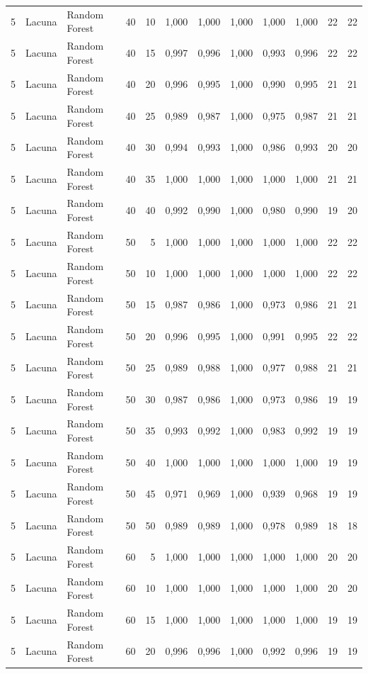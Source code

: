 \begin{longtable}{@{}rllrrrrrrrrr@{}}
5 & Lacuna & Random Forest & 40 & 10 & 1,000 & 1,000 & 1,000 & 1,000 & 1,000 & 22 & 22 \\
5 & Lacuna & Random Forest & 40 & 15 & 0,997 & 0,996 & 1,000 & 0,993 & 0,996 & 22 & 22 \\
5 & Lacuna & Random Forest & 40 & 20 & 0,996 & 0,995 & 1,000 & 0,990 & 0,995 & 21 & 21 \\
5 & Lacuna & Random Forest & 40 & 25 & 0,989 & 0,987 & 1,000 & 0,975 & 0,987 & 21 & 21 \\
5 & Lacuna & Random Forest & 40 & 30 & 0,994 & 0,993 & 1,000 & 0,986 & 0,993 & 20 & 20 \\
5 & Lacuna & Random Forest & 40 & 35 & 1,000 & 1,000 & 1,000 & 1,000 & 1,000 & 21 & 21 \\
5 & Lacuna & Random Forest & 40 & 40 & 0,992 & 0,990 & 1,000 & 0,980 & 0,990 & 19 & 20 \\
5 & Lacuna & Random Forest & 50 & 5 & 1,000 & 1,000 & 1,000 & 1,000 & 1,000 & 22 & 22 \\
5 & Lacuna & Random Forest & 50 & 10 & 1,000 & 1,000 & 1,000 & 1,000 & 1,000 & 22 & 22 \\
5 & Lacuna & Random Forest & 50 & 15 & 0,987 & 0,986 & 1,000 & 0,973 & 0,986 & 21 & 21 \\
5 & Lacuna & Random Forest & 50 & 20 & 0,996 & 0,995 & 1,000 & 0,991 & 0,995 & 22 & 22 \\
5 & Lacuna & Random Forest & 50 & 25 & 0,989 & 0,988 & 1,000 & 0,977 & 0,988 & 21 & 21 \\
5 & Lacuna & Random Forest & 50 & 30 & 0,987 & 0,986 & 1,000 & 0,973 & 0,986 & 19 & 19 \\
5 & Lacuna & Random Forest & 50 & 35 & 0,993 & 0,992 & 1,000 & 0,983 & 0,992 & 19 & 19 \\
5 & Lacuna & Random Forest & 50 & 40 & 1,000 & 1,000 & 1,000 & 1,000 & 1,000 & 19 & 19 \\
5 & Lacuna & Random Forest & 50 & 45 & 0,971 & 0,969 & 1,000 & 0,939 & 0,968 & 19 & 19 \\
5 & Lacuna & Random Forest & 50 & 50 & 0,989 & 0,989 & 1,000 & 0,978 & 0,989 & 18 & 18 \\
5 & Lacuna & Random Forest & 60 & 5 & 1,000 & 1,000 & 1,000 & 1,000 & 1,000 & 20 & 20 \\
5 & Lacuna & Random Forest & 60 & 10 & 1,000 & 1,000 & 1,000 & 1,000 & 1,000 & 20 & 20 \\
5 & Lacuna & Random Forest & 60 & 15 & 1,000 & 1,000 & 1,000 & 1,000 & 1,000 & 19 & 19 \\
5 & Lacuna & Random Forest & 60 & 20 & 0,996 & 0,996 & 1,000 & 0,992 & 0,996 & 19 & 19 \\

\end{longtable}
